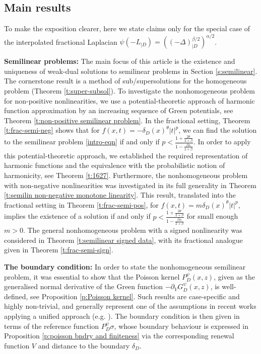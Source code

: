 \documentclass[12pt,a4paper,onecolumn]{article}
\theoremstyle{definition}
\newcommand{\1}{\mathbf 1}
\newcommand{\de}{\delta_D}
\newcommand{\Lo}{\psi(-L_{|D})}
\newcommand{\INTFR}{\left((-\Delta)^{\beta/2}_{|D}\right)^{\alpha/2}}
\newcommand{\GDP}{G_D^\psi}
\newcommand{\PDS}{P^{\psi}_{ D}}
\numberwithin{equation}{section}
\begin{document}
    \subsection*{Main results}
        To make the exposition clearer, here we state claims only for the special case of the interpolated fractional Laplacian $\Lo=\INTFR$.
        
        \noindent\textbf{Semilinear problems:} The main focus of this article is the existence and uniqueness of weak-dual solutions to semilinear problems in Section \ref{s:semilinear}. The cornerstone result is a method of sub/supersolutions for the homogeneous problem (Theorem \ref{t:super-subsol}). 
        To investigate the nonhomogeneous problem for non-positive nonlinearities, we use a potential-theoretic approach of harmonic function approximation by an increasing sequence of Green potentials, see Theorem \ref{t:non-positive semilinear problem}. In the fractional setting, Theorem \ref{t:frac-semi-neg} shows that for $f(x,t)=-\de(x)^\theta|t|^p$, we can find the solution to the semilinear problem \eqref{intro-eqn} if and only if $p<\frac{1+\frac{2\theta}{2+\beta}}{1-\frac{\beta\alpha}{2+\beta}}$. In order to apply this potential-theoretic approach, we established the required representation of harmonic functions and the equivalence with the probabilistic notion of harmonicity, see Theorem \ref{t:1627}. Furthermore, the nonhomogeneous problem with non-negative nonlinearities was investigated in its full generality in Theorem \ref{t:semilin non-negative monotone linearity}. This result, translated into the fractional setting in Theorem \ref{t:frac-semi-pos}, for $f(x,t)=m\de(x)^\theta|t|^p$, implies the existence of a solution if and only if $p<\frac{1+\frac{2\theta}{2+\beta}}{1-\frac{\beta\alpha}{2+\beta}}$ for small enough $m>0$. The general nonhomogeneous problem with a signed nonlinearity was considered in Theorem \ref{t:semilinear signed data}, with its fractional  analogue given in Theorem \ref{t:frac-semi-sign}.

        \noindent\textbf{The boundary condition:} 
        In order to state the nonhomogeneous semilinear problem, it was essential to show that the Poisson kernel  $\PDS(x,z)$, given as the generalised normal derivative of the Green function $-\partial_V\GDP(x,z)$, is well-defined, see Proposition \ref{p:Poisson kernel}. Such results are case-specific and highly non-trivial, and generally represent one of the assumptions in recent works applying a unified approach (e.g. \cite{CGcV-jfa21,AGCV19}). The boundary condition is then given in terms of the reference function  $\PDS \sigma$, whose boundary behaviour is expressed in Proposition \ref{p:poisson bndry and finiteness} via the corresponding renewal function $V$ and distance to the boundary $\de$. 
        
\end{document}
